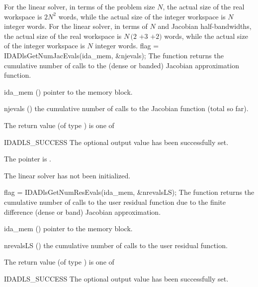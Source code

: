 {{}
{
  For the {\idadense} linear solver, in terms of the problem size $N$,
  the actual size of the real workspace is $2N^2$  words,
  while the actual size of the integer workspace is $N$ integer words.
  For the {\idaband} linear solver, in terms of $N$ 
  and Jacobian half-bandwidths, the actual size of the real workspace is
  $N\,(2$ $+ 3$  $+ 2)$  words,
  while the actual size of the integer workspace is $N$ integer words.
}
{
  flag = IDADlsGetNumJacEvals(ida\_mem, \&njevals);
}
{
  The function  returns the
  cumulative number of calls to the {\idadls} (dense or banded) 
  Jacobian approximation function.
}
{
  \begin{args}[njevals]
  \item[ida\_mem] ()
    pointer to the {\idas} memory block.
  \item[njevals] ()
    the cumulative number of calls to the Jacobian function (total so far).
  \end{args}
}
{
  The return value  (of type ) is one of
  \begin{args}
  \item[IDADLS\_SUCCESS] 
    The optional output value has been successfully set.
  \item[\Id{IDADLS\_MEM\_NULL}]
    The  pointer is .
  \item[\Id{IDADLS\_LMEM\_NULL}]
    The {\idadense} linear solver has not been initialized.
  \end{args}
}
{}
{
  flag = IDADlsGetNumResEvals(ida\_mem, \&nrevalsLS);
}
{
  The function  returns the
  cumulative number of calls to the user residual function due to the 
  finite difference (dense or band) Jacobian approximation.
}
{
  \begin{args}[nrevalsLS]
  \item[ida\_mem] ()
    pointer to the {\idas} memory block.
  \item[nrevalsLS] ()
    the cumulative number of calls to the user residual function.
  \end{args}
}
{
  The return value  (of type ) is one of
  \begin{args}
  \item[IDADLS\_SUCCESS] 
    The optional output value has been successfully set.

\end{args}}}
